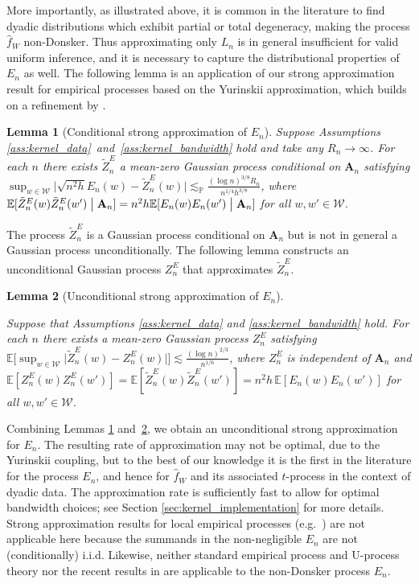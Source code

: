 \documentclass[11pt,lof]{puthesis}
\renewcommand{\P}{\ensuremath{\mathbb{P}}}
\newcommand{\E}{\ensuremath{\mathbb{E}}}
\newcommand{\bA}{\ensuremath{\mathbf{A}}}
\newcommand{\cW}{\ensuremath{\mathcal{W}}}
\theoremstyle{break}
\newtheorem{lemma}{Lemma}[section]
\theoremstyle{proof}
\begin{document}
More importantly, as illustrated above, it is common in the literature to find
dyadic distributions which exhibit partial or total degeneracy, making the
process $\hat{f}_W$ non-Donsker. Thus approximating only $L_n$ is in general
insufficient for valid uniform inference, and it is necessary to capture the
distributional properties of $E_n$ as well.
The following lemma is an application of our strong approximation result for
empirical processes based on the Yurinskii approximation, which builds on a
refinement by \citet{belloni2019conditional}.

\begin{lemma}[Conditional strong approximation of $E_n$]
\label{lem:kernel_conditional_strong_approx_En}
%
Suppose Assumptions \ref{ass:kernel_data}~and~\ref{ass:kernel_bandwidth} hold
and take any $R_n \to \infty$. For each $n$ there exists $\tilde Z^E_n$
a mean-zero Gaussian process conditional on $\bA_n$ satisfying
$\sup_{w \in \cW}
\big| \sqrt{n^2h} E_n(w) - \tilde Z_n^E(w) \big|
\lesssim_\P \frac{(\log n)^{3/8} R_n}{n^{1/4}h^{3/8}}$,
where $\E[\tilde Z_n^E(w)\tilde Z_n^E(w')\bigm\vert \bA_n]
=n^2h\E[E_n(w)E_n(w')\bigm\vert \bA_n]$
for all $w, w' \in \cW$.
%
\end{lemma}

The process $\tilde Z_n^E$ is a Gaussian process conditional on $\bA_n$ but is
not in general a Gaussian process unconditionally. The following lemma
constructs an unconditional Gaussian process $Z_n^E$ that approximates
$\tilde Z_n^E$.

\begin{lemma}[Unconditional strong approximation of $E_n$]
\label{lem:kernel_unconditional_strong_approx_En}

Suppose that Assumptions \ref{ass:kernel_data} and
\ref{ass:kernel_bandwidth} hold. For each $n$ there exists
a mean-zero Gaussian process $Z^E_n$ satisfying
$\E\big[ \sup_{w \in \cW} \big|\tilde Z_n^E(w) - Z_n^E(w)\big| \big]
\lesssim \frac{(\log n)^{2/3}}{n^{1/6}}$,
where $Z_n^E$ is independent of $\bA_n$ and
$\E[Z_n^E(w)Z_n^E(w')]=\E[\tilde Z_n^E(w)\tilde Z_n^E(w')]
= n^2h \, \E[E_n(w)E_n(w')]$ for all $w, w' \in \cW$.
%
\end{lemma}

Combining Lemmas \ref{lem:kernel_conditional_strong_approx_En}
and~\ref{lem:kernel_unconditional_strong_approx_En}, we obtain
an unconditional strong
approximation for $E_n$. The resulting rate of approximation may not be
optimal, due to the Yurinskii coupling, but to the best of our knowledge it is
the first in the literature for the process $E_n$, and hence for $\hat{f}_W$
and its associated $t$-process in the context of dyadic data. The approximation
rate is sufficiently fast to allow for optimal bandwidth choices; see Section
\ref{sec:kernel_implementation} for more details. Strong approximation results
for
local empirical processes (e.g.\ \citealp{gine2010confidence}) are not
applicable here because the summands in the non-negligible $E_n$ are not
(conditionally) i.i.d. Likewise, neither standard empirical process and
U-process theory \citep{van1996weak,gine2021mathematical} nor the recent
results in \citet{davezies2021exchangeable} are applicable to the non-Donsker
process $E_n$.
\end{document}
